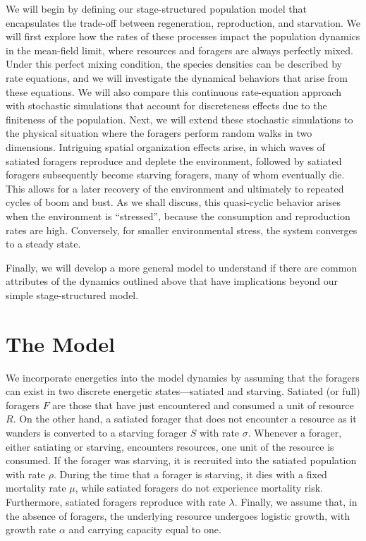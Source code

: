 \documentclass[11pt]{iopart}
\begin{document}
We will begin by defining our stage-structured population model that
encapsulates the trade-off between regeneration, reproduction, and
starvation.  We will first explore how the rates of these processes impact
the population dynamics in the mean-field limit, where resources and foragers
are always perfectly mixed.  Under this perfect mixing condition, the species
densities can be described by rate equations, and we will investigate the
dynamical behaviors that arise from these equations.  We will also compare
this continuous rate-equation approach with stochastic simulations that
account for discreteness effects due to the finiteness of the population.
Next, we will extend these stochastic simulations to the physical situation
where the foragers perform random walks in two dimensions.  Intriguing
spatial organization effects arise, in which waves of satiated foragers
reproduce and deplete the environment, followed by satiated foragers
subsequently become starving foragers, many of whom eventually die.  This
allows for a later recovery of the environment and ultimately to repeated
cycles of boom and bust.  As we shall discuss, this quasi-cyclic behavior
arises when the environment is ``stressed'', because the consumption and
reproduction rates are high.  Conversely, for smaller environmental stress,
the system converges to a steady state.

Finally, we will develop a more general model to understand if there are
common attributes of the dynamics outlined above that have implications
beyond our simple stage-structured model.

\section{The Model}

We incorporate energetics into the model dynamics by assuming that the
foragers can exist in two discrete energetic states---satiated and starving.
Satiated (or full) foragers $F$ are those that have just encountered and
consumed a unit of resource $R$.  On the other hand, a satiated forager that
does not encounter a resource as it wanders is converted to a starving
forager $S$ with rate $\sigma$.  Whenever a forager, either satiating or
starving, encounters resources, one unit of the resource is consumed.  If the
forager was starving, it is recruited into the satiated population with rate
$\rho$.  During the time that a forager is starving, it dies with a fixed
mortality rate $\mu$, while satiated foragers do not experience mortality
risk.  Furthermore, satiated foragers reproduce with rate $\lambda$.
Finally, we assume that, in the absence of foragers, the underlying resource
undergoes logistic growth, with growth rate $\alpha$ and carrying capacity
equal to one.
\end{document}
